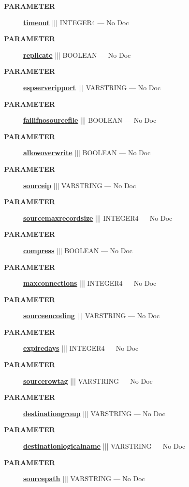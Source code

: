 \par
\begin{description}
\item [\colorbox{tagtype}{\color{white} \textbf{\textsf{PARAMETER}}}] \textbf{\underline{timeout}} ||| INTEGER4 --- No Doc
\item [\colorbox{tagtype}{\color{white} \textbf{\textsf{PARAMETER}}}] \textbf{\underline{replicate}} ||| BOOLEAN --- No Doc
\item [\colorbox{tagtype}{\color{white} \textbf{\textsf{PARAMETER}}}] \textbf{\underline{espserveripport}} ||| VARSTRING --- No Doc
\item [\colorbox{tagtype}{\color{white} \textbf{\textsf{PARAMETER}}}] \textbf{\underline{failifnosourcefile}} ||| BOOLEAN --- No Doc
\item [\colorbox{tagtype}{\color{white} \textbf{\textsf{PARAMETER}}}] \textbf{\underline{allowoverwrite}} ||| BOOLEAN --- No Doc
\item [\colorbox{tagtype}{\color{white} \textbf{\textsf{PARAMETER}}}] \textbf{\underline{sourceip}} ||| VARSTRING --- No Doc
\item [\colorbox{tagtype}{\color{white} \textbf{\textsf{PARAMETER}}}] \textbf{\underline{sourcemaxrecordsize}} ||| INTEGER4 --- No Doc
\item [\colorbox{tagtype}{\color{white} \textbf{\textsf{PARAMETER}}}] \textbf{\underline{compress}} ||| BOOLEAN --- No Doc
\item [\colorbox{tagtype}{\color{white} \textbf{\textsf{PARAMETER}}}] \textbf{\underline{maxconnections}} ||| INTEGER4 --- No Doc
\item [\colorbox{tagtype}{\color{white} \textbf{\textsf{PARAMETER}}}] \textbf{\underline{sourceencoding}} ||| VARSTRING --- No Doc
\item [\colorbox{tagtype}{\color{white} \textbf{\textsf{PARAMETER}}}] \textbf{\underline{expiredays}} ||| INTEGER4 --- No Doc
\item [\colorbox{tagtype}{\color{white} \textbf{\textsf{PARAMETER}}}] \textbf{\underline{sourcerowtag}} ||| VARSTRING --- No Doc
\item [\colorbox{tagtype}{\color{white} \textbf{\textsf{PARAMETER}}}] \textbf{\underline{destinationgroup}} ||| VARSTRING --- No Doc
\item [\colorbox{tagtype}{\color{white} \textbf{\textsf{PARAMETER}}}] \textbf{\underline{destinationlogicalname}} ||| VARSTRING --- No Doc
\item [\colorbox{tagtype}{\color{white} \textbf{\textsf{PARAMETER}}}] \textbf{\underline{sourcepath}} ||| VARSTRING --- No Doc
\end{description}







